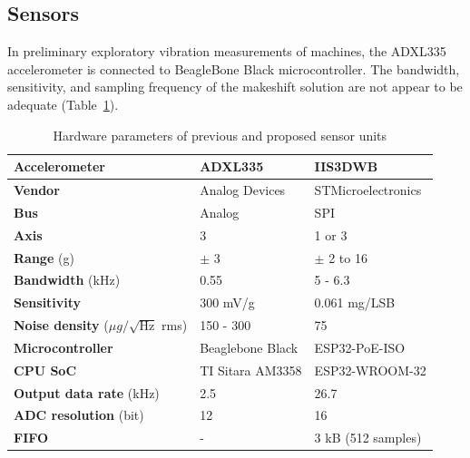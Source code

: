 \subsection{Sensors}
In preliminary exploratory vibration measurements of machines, the ADXL335 accelerometer is connected to BeagleBone Black microcontroller. The bandwidth, sensitivity, and sampling frequency of the makeshift solution are not appear to be adequate (Table~\ref{tab:design:hw-sensors}).

\begin{table}[ht]
\renewcommand{\arraystretch}{1.2}
\centering
\begin{tabular}{|l|l|l|}
\hline
\textbf{Accelerometer}                           & \textbf{ADXL335} & \textbf{IIS3DWB}   \\ \hline
\textbf{Vendor}                                  & Analog Devices   & STMicroelectronics \\ \hline
\textbf{Bus}                                     & Analog           & SPI                \\ \hline
\textbf{Axis}                                    & 3                & 1 or 3             \\ \hline
\textbf{Range} (g)                               & $\pm$ 3          & $\pm$ 2 to 16      \\ \hline
\textbf{Bandwidth} (kHz)                         & 0.55             & 5 - 6.3            \\ \hline
\textbf{Sensitivity}                             & 300 mV/g         & 0.061 mg/LSB       \\ \hline
\textbf{Noise density} ($\mu g / \sqrt{\mathrm{Hz}}$ rms) & 150 - 300        & 75                 \\ \hline
\textbf{Microcontroller}                         & Beaglebone Black & ESP32-PoE-ISO      \\ \hline
\textbf{CPU SoC}                                 & TI Sitara AM3358 & ESP32-WROOM-32     \\ \hline
\textbf{Output data rate} (kHz)                  & 2.5              & 26.7               \\ \hline
\textbf{ADC resolution} (bit)                    & 12               & 16                 \\ \hline
\textbf{FIFO}                                    & -                & 3 kB (512 samples) \\ \hline
\end{tabular}
\caption{Hardware parameters of previous and proposed sensor units}
\label{tab:design:hw-sensors}
\end{table}

